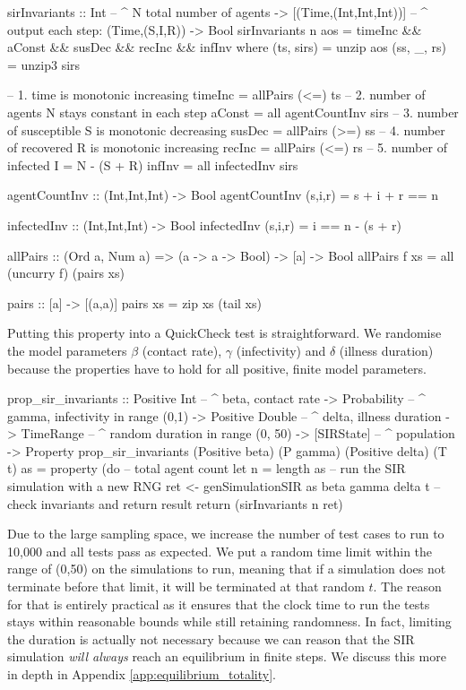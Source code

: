 \begin{HaskellCode}
sirInvariants :: Int                    -- ^ N total number of agents
              -> [(Time,(Int,Int,Int))] -- ^ output each step: (Time,(S,I,R))
              -> Bool
sirInvariants n aos = timeInc && aConst && susDec && recInc && infInv
  where
    (ts, sirs)  = unzip aos
    (ss, _, rs) = unzip3 sirs

    -- 1. time is monotonic increasing
    timeInc = allPairs (<=) ts
    -- 2. number of agents N stays constant in each step
    aConst = all agentCountInv sirs
    -- 3. number of susceptible S is monotonic decreasing
    susDec = allPairs (>=) ss
    -- 4. number of recovered R is monotonic increasing
    recInc = allPairs (<=) rs
    -- 5. number of infected I = N - (S + R)
    infInv = all infectedInv sirs

    agentCountInv :: (Int,Int,Int) -> Bool
    agentCountInv (s,i,r) = s + i + r == n

    infectedInv :: (Int,Int,Int) -> Bool
    infectedInv (s,i,r) = i == n - (s + r)

    allPairs :: (Ord a, Num a) => (a -> a -> Bool) -> [a] -> Bool
    allPairs f xs = all (uncurry f) (pairs xs)

    pairs :: [a] -> [(a,a)]
    pairs xs = zip xs (tail xs)
\end{HaskellCode}

Putting this property into a QuickCheck test is straightforward. We randomise the model parameters $\beta$ (contact rate), $\gamma$ (infectivity) and $\delta$ (illness duration) because the properties have to hold for all positive, finite model parameters.

\begin{HaskellCode}
prop_sir_invariants :: Positive Int    -- ^ beta, contact rate
                    -> Probability     -- ^ gamma, infectivity in range (0,1)
                    -> Positive Double -- ^ delta, illness duration
                    -> TimeRange       -- ^ random duration in range (0, 50)
                    -> [SIRState]      -- ^ population
                    -> Property
prop_sir_invariants 
    (Positive beta) (P gamma) (Positive delta) (T t) as  = property (do
  -- total agent count
  let n = length as
  -- run the SIR simulation with a new RNG 
  ret <- genSimulationSIR as beta gamma delta t
  -- check invariants and return result
  return (sirInvariants n ret)
\end{HaskellCode}

Due to the large sampling space, we increase the number of test cases to run to 10,000 and all tests pass as expected. We put a random time limit within the range of (0,50) on the simulations to run, meaning that if a simulation does not terminate before that limit, it will be terminated at that random $t$. The reason for that is entirely practical as it ensures that the clock time to run the tests stays within reasonable bounds while still retaining randomness. In fact, limiting the duration is actually not necessary because we can reason that the SIR simulation \textit{will always} reach an equilibrium in finite steps. We discuss this more in depth in Appendix \ref{app:equilibrium_totality}.

